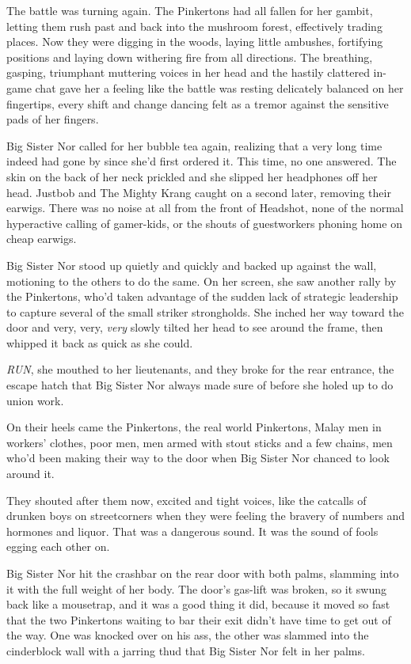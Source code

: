 The battle was turning again. The Pinkertons had all fallen for her
gambit, letting them rush past and back into the mushroom forest,
effectively trading places. Now they were digging in the woods,
laying little ambushes, fortifying positions and laying down
withering fire from all directions. The breathing, gasping,
triumphant muttering voices in her head and the hastily clattered
in-game chat gave her a feeling like the battle was resting
delicately balanced on her fingertips, every shift and change
dancing felt as a tremor against the sensitive pads of her
fingers.

Big Sister Nor called for her bubble tea again, realizing that a
very long time indeed had gone by since she'd first ordered it.
This time, no one answered. The skin on the back of her neck
prickled and she slipped her headphones off her head. Justbob and
The Mighty Krang caught on a second later, removing their earwigs.
There was no noise at all from the front of Headshot, none of the
normal hyperactive calling of gamer-kids, or the shouts of
guestworkers phoning home on cheap earwigs.

Big Sister Nor stood up quietly and quickly and backed up against
the wall, motioning to the others to do the same. On her screen,
she saw another rally by the Pinkertons, who'd taken advantage of
the sudden lack of strategic leadership to capture several of the
small striker strongholds. She inched her way toward the door and
very, very, \emph{very} slowly tilted her head to see around the
frame, then whipped it back as quick as she could.

\emph{RUN}, she mouthed to her lieutenants, and they broke for the
rear entrance, the escape hatch that Big Sister Nor always made
sure of before she holed up to do union work.

On their heels came the Pinkertons, the real world Pinkertons,
Malay men in workers' clothes, poor men, men armed with stout
sticks and a few chains, men who'd been making their way to the
door when Big Sister Nor chanced to look around it.

They shouted after them now, excited and tight voices, like the
catcalls of drunken boys on streetcorners when they were feeling
the bravery of numbers and hormones and liquor. That was a
dangerous sound. It was the sound of fools egging each other on.

Big Sister Nor hit the crashbar on the rear door with both palms,
slamming into it with the full weight of her body. The door's
gas-lift was broken, so it swung back like a mousetrap, and it was
a good thing it did, because it moved so fast that the two
Pinkertons waiting to bar their exit didn't have time to get out of
the way. One was knocked over on his ass, the other was slammed
into the cinderblock wall with a jarring thud that Big Sister Nor
felt in her palms.

